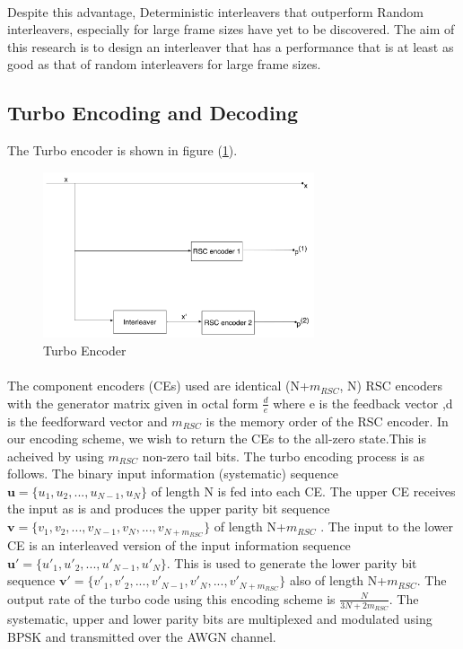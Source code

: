 \documentclass[20 pts]{article}
\begin{document}
\paragraph{}
Despite this advantage, Deterministic interleavers that outperform Random interleavers,
 especially for large frame sizes have yet to be discovered. The aim of this research is
  to design an interleaver that has a performance that is at least as good as that of 
  random 
  interleavers for large frame sizes. 

\subsection{Turbo Encoding and Decoding}
The Turbo encoder is shown in figure (\ref{TC}).

\begin{center}
\begin{figure}[h!]
\includegraphics[width=8cm]{TurboEncoder.pdf}
\caption{Turbo Encoder}
\label{TC}
\end{figure}
\end{center}
\paragraph{}The component encoders (CEs) used are identical (N+$m_{RSC}$, N) 
RSC encoders with the 
generator matrix given in octal form $\frac{d}{e}$ where e is the feedback vector 
,d is
the feedforward vector and $m_{RSC}$ is the memory order of the RSC encoder. 
In our
encoding scheme, we wish to return the CEs to the all-zero state.This is acheived by
using $m_{RSC}$ non-zero tail bits. The turbo encoding process is as follows.
The binary input information (systematic) 
sequence $\mathbf{u}=\{u_1, u_2,...,u_{N-1}, u_N \}$ of
 length N is fed into each CE. The upper CE receives the
  input as is and produces the upper parity bit sequence 
  $\mathbf{v}=\{v_1, v_2,...,v_{N-1}, v_N,...,v_{N+m_{RSC}} \}$
  of length N+$m_{RSC}$ . The input to
  the lower CE is an interleaved version of the input information sequence 
  $\mathbf{u}'=\{u'_1, u'_2,...,u'_{N-1}, u'_N \}$. This is used to generate the 
  lower parity bit sequence 
  $\mathbf{v}'=\{v'_1, v'_2,...,v'_{N-1}, v'_N,...,v'_{N+m_{RSC}} \}$ also
  of length N+$m_{RSC}$. The output rate of the turbo code using this encoding
  scheme is $\frac{N}{3N+2m_{RSC}}$. The systematic, upper and lower parity bits 
  are multiplexed and modulated using BPSK and transmitted over the AWGN channel.
\end{document}
